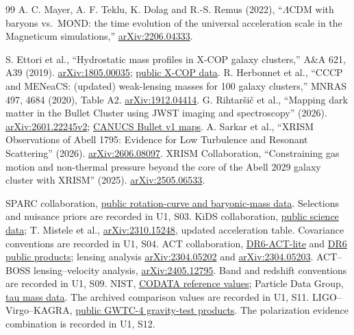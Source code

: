 \begin{thebibliography}{99}
 A. C. Mayer, A. F. Teklu, K. Dolag and R.-S. Remus (2022),
``$\Lambda$CDM with baryons vs.\ MOND: the time evolution of the universal
acceleration scale in the Magneticum simulations,''
\href{https://arxiv.org/abs/2206.04333}{arXiv:2206.04333}.

 S. Ettori et al., ``Hydrostatic mass profiles in X-COP galaxy clusters,'' A\&A 621, A39 (2019).
\href{https://arxiv.org/abs/1805.00035}{arXiv:1805.00035};
\href{https://dominiqueeckert.wixsite.com/xcop/data}{public X-COP data}.
 R. Herbonnet et al., ``CCCP and MENeaCS: (updated) weak-lensing masses for 100 galaxy clusters,'' MNRAS 497, 4684 (2020), Table A2.
\href{https://arxiv.org/abs/1912.04414}{arXiv:1912.04414}.
 G. Rihtar\v{s}i\v{c} et al., ``Mapping dark matter in the Bullet Cluster using JWST imaging and spectroscopy'' (2026).
\href{https://arxiv.org/html/2601.22245v2}{arXiv:2601.22245v2};
\href{https://niriss.github.io/lensing.html}{CANUCS Bullet v1 maps}.
 A. Sarkar et al., ``XRISM Observations of Abell 1795: Evidence for Low Turbulence and Resonant Scattering'' (2026).
\href{https://arxiv.org/abs/2606.08097}{arXiv:2606.08097}.
 XRISM Collaboration, ``Constraining gas motion and non-thermal pressure beyond the core of the Abell 2029 galaxy cluster with XRISM'' (2025).
\href{https://arxiv.org/abs/2505.06533}{arXiv:2505.06533}.


 SPARC collaboration, \href{https://astroweb.case.edu/SPARC/}{public rotation-curve and baryonic-mass data}. Selections and nuisance priors are recorded in U1, S03.
 KiDS collaboration, \href{https://kids.strw.leidenuniv.nl/sciencedata.php}{public science data}; T. Mistele et al., \href{https://arxiv.org/abs/2310.15248}{arXiv:2310.15248}, updated acceleration table. Covariance conventions are recorded in U1, S04.
 ACT collaboration, \href{https://github.com/ACTCollaboration/DR6-ACT-lite}{DR6-ACT-lite} and \href{https://lambda.gsfc.nasa.gov/product/act/act_dr6.02/index.html}{DR6 public products}; lensing analysis \href{https://arxiv.org/abs/2304.05202}{arXiv:2304.05202} and \href{https://arxiv.org/abs/2304.05203}{arXiv:2304.05203}.
 ACT--BOSS lensing--velocity analysis, \href{https://arxiv.org/abs/2405.12795}{arXiv:2405.12795}. Band and redshift conventions are recorded in U1, S09.
 NIST, \href{https://physics.nist.gov/cuu/Constants/}{CODATA reference values}; Particle Data Group, \href{https://pdglive.lbl.gov/DataBlock.action?node=S035M}{tau mass data}. The archived comparison values are recorded in U1, S11.
 LIGO--Virgo--KAGRA, \href{https://dcc.ligo.org/LIGO-P2600128/public}{public GWTC-4 gravity-test products}. The polarization evidence combination is recorded in U1, S12.


\end{thebibliography}
